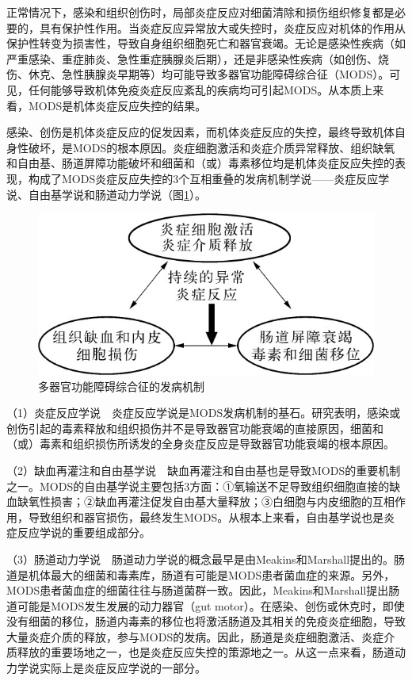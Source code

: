 正常情况下，感染和组织创伤时，局部炎症反应对细菌清除和损伤组织修复都是必要的，具有保护性作用。当炎症反应异常放大或失控时，炎症反应对机体的作用从保护性转变为损害性，导致自身组织细胞死亡和器官衰竭。无论是感染性疾病（如严重感染、重症肺炎、急性重症胰腺炎后期），还是非感染性疾病（如创伤、烧伤、休克、急性胰腺炎早期等）均可能导致多器官功能障碍综合征（MODS）。可见，任何能够导致机体免疫炎症反应紊乱的疾病均可引起MODS。从本质上来看，MODS是机体炎症反应失控的结果。

感染、创伤是机体炎症反应的促发因素，而机体炎症反应的失控，最终导致机体自身性破坏，是MODS的根本原因。炎症细胞激活和炎症介质异常释放、组织缺氧和自由基、肠道屏障功能破坏和细菌和（或）毒素移位均是机体炎症反应失控的表现，构成了MODS炎症反应失控的3个互相重叠的发病机制学说------炎症反应学说、自由基学说和肠道动力学说（图\ref{fig1-1}）。

\begin{figure}[!htbp]
 \centering
 \includegraphics{./images/Image00002.jpg}
 \captionsetup{justification=centering}
 \caption{多器官功能障碍综合征的发病机制}
 \label{fig1-1}
  \end{figure} 

（1）炎症反应学说　炎症反应学说是MODS发病机制的基石。研究表明，感染或创伤引起的毒素释放和组织损伤并不是导致器官功能衰竭的直接原因，细菌和（或）毒素和组织损伤所诱发的全身炎症反应是导致器官功能衰竭的根本原因。

（2）缺血再灌注和自由基学说　缺血再灌注和自由基也是导致MODS的重要机制之一。MODS的自由基学说主要包括3方面：①氧输送不足导致组织细胞直接的缺血缺氧性损害；②缺血再灌注促发自由基大量释放；③白细胞与内皮细胞的互相作用，导致组织和器官损伤，最终发生MODS。从根本上来看，自由基学说也是炎症反应学说的重要组成部分。

（3）肠道动力学说　肠道动力学说的概念最早是由Meakins和Marshall提出的。肠道是机体最大的细菌和毒素库，肠道有可能是MODS患者菌血症的来源。另外，MODS患者菌血症的细菌往往与肠道菌群一致。因此，Meakins和Marshall提出肠道可能是MODS发生发展的动力器官（gut
motor）。在感染、创伤或休克时，即使没有细菌的移位，肠道内毒素的移位也将激活肠道及其相关的免疫炎症细胞，导致大量炎症介质的释放，参与MODS的发病。因此，肠道是炎症细胞激活、炎症介质释放的重要场地之一，也是炎症反应失控的策源地之一。从这一点来看，肠道动力学说实际上是炎症反应学说的一部分。

